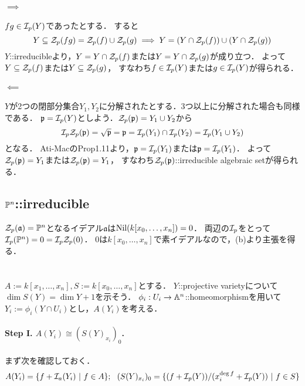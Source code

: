 \documentclass[a4paper]{jarticle}
\newcommand{\I}[1]{\mathfrak{#1}}
\begin{document}
    \paragraph{$\implies$}
    $fg \in \mathcal{I}_p(Y)$であったとする．
    すると
    \[ Y \subseteq \mathcal{Z}_p(fg)=\mathcal{Z}_p(f) \cup \mathcal{Z}_p(g) \implies Y = (Y \cap \mathcal{Z}_p(f)) \cup (Y \cap \mathcal{Z}_p(g))\]
    $Y$::irreducibleより，$Y = Y \cap \mathcal{Z}_p(f)$または$Y=Y \cap \mathcal{Z}_p(g)$が成り立つ．
    よって$Y \subseteq \mathcal{Z}_p(f)$または$Y \subseteq \mathcal{Z}_p(g)$，
    すなわち$f \in \mathcal{I}_p(Y)$または$g \in \mathcal{I}_p(Y)$が得られる．

    \paragraph{$\impliedby$}
    $Y$が2つの閉部分集合$Y_1, Y_2$に分解されたとする．3つ以上に分解された場合も同様である．
    $\I{p}=\defsp(Y)$としよう．$\zerosp(\I{p})=Y_1 \cup Y_2$から
    \[ \defsp\zerosp(\I{p})=\sqrt{\I{p}}=\I{p}=\defsp(Y_1) \cap \defsp(Y_2)=\defsp(Y_1 \cup Y_2) \]となる．
    Ati-MacのProp1.11より，$\I{p}=\defsp(Y_1)$または$\I{p}=\defsp(Y_1)$．
    よって$\zerosp(\I{p})=Y_1$または$\zerosp(\I{p})=Y_1$，
    すなわち$\zerosp(\I{p})$::irreducible algebraic setが得られる．

    \subsection{$\mathbb{P}^n$::irreducible}
    $\zerosp(\I{a})=\proj^n$となるイデアル$\I{a}$は$\operatorname{Nil}(k[x_0,\dots,x_n])=0$．
    両辺の$\mathcal{I}_p$をとって$\mathcal{I}_p(\mathbb{P}^n)=0=\mathcal{I}_p\mathcal{Z}_p(0)$．
    0は$k[x_0,\dots,x_n]$で素イデアルなので，(b)より主張を得る．

\section{} %

\section{} %
    $A:=k[x_1,\dots,x_n], S:=k[x_0,\dots,x_n]$とする．
    $Y$::projective varietyについて$\dim S(Y)=\dim Y +1$を示そう．
    $\phi_i:U_i \to \mathbb{A}^n$::homeomorphismを用いて
    $Y_i:=\phi_i(Y \cap U_i)$とし，$A(Y_i)$を考える．

    \paragraph{Step I. $A(Y_i) \cong (S(Y)_{x_i})_0$.}
    まず次を確認しておく．
    \[
        A(Y_i)=\{ f+\mathcal{I}_a(Y_i) ~|~ f \in A\};~~
        (S(Y)_{x_i})_0=\{ (f+\mathcal{I}_p(Y))/(x_i^{\deg f}+\mathcal{I}_p(Y)) ~|~ f \in S\}
    \]
\end{document}
